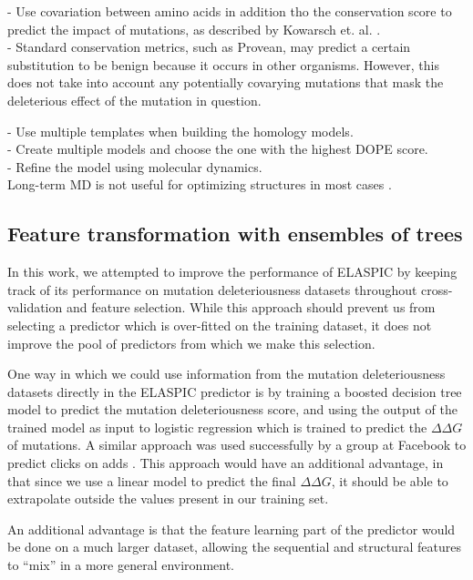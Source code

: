 
- Use covariation between amino acids in addition tho the conservation score to predict the impact of mutations, as described by Kowarsch et. al. \cite{kowarsch_correlated_2010}. \\
- Standard conservation metrics, such as Provean, may predict a certain substitution to be benign because it occurs in other organisms. However, this does not take into account any potentially covarying mutations that mask the deleterious effect of the mutation in question.



- Use multiple templates when building the homology models. \\
- Create multiple models and choose the one with the highest DOPE score. \\
- Refine the model using molecular dynamics. \\

Long-term MD is not useful for optimizing structures in most cases \cite{raval_refinement_2012}.

\subsection{Feature transformation with ensembles of trees}

In this work, we attempted to improve the performance of ELASPIC by keeping track of its performance on mutation deleteriousness datasets throughout cross-validation and feature selection. While this approach should prevent us from selecting a predictor which is over-fitted on the training dataset, it does not improve the pool of predictors from which we make this selection.

One way in which we could use information from the mutation deleteriousness datasets directly in the ELASPIC predictor is by training a boosted decision tree model to predict the mutation deleteriousness score, and using the output of the trained model as input to logistic regression which is trained to predict the $\Delta \Delta G$ of mutations. A similar approach was used successfully by a group at Facebook to predict clicks on adds \cite{he_practical_2014}. This approach would have an additional advantage, in that since we use a linear model to predict the final $\Delta \Delta G$, it should be able to extrapolate outside the values present in our training set.

An additional advantage is that the feature learning part of the predictor would be done on a much larger dataset, allowing the sequential and structural features to ``mix'' in a more general environment.

